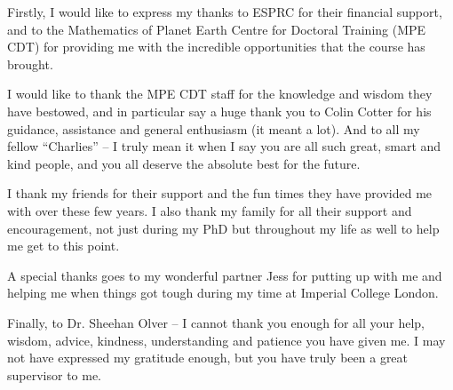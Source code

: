
\cleardoublepage


\begin{acknowledgements}

Firstly, I would like to express my thanks to ESPRC for their financial support, and to the Mathematics of Planet Earth Centre for Doctoral Training (MPE CDT) for providing me with the incredible opportunities that the course has brought. 

I would like to thank the MPE CDT staff for the knowledge and wisdom they have bestowed, and in particular say a huge thank you to Colin Cotter for his guidance, assistance and general enthusiasm (it meant a lot). And to all my fellow \enquote{Charlies} -- I truly mean it when I say you are all such great, smart and kind people, and you all deserve the absolute best for the future.

I thank my friends for their support and the fun times they have provided me with over these few years. I also thank my family for all their support and encouragement, not just during my PhD but throughout my life as well to help me get to this point.

A special thanks goes to my wonderful partner Jess for putting up with me and helping me when things got tough during my time at Imperial College London.

Finally, to Dr. Sheehan Olver -- I cannot thank you enough for all your help, wisdom, advice, kindness, understanding and patience you have given me. I may not have expressed my gratitude enough, but you have truly been a great supervisor to me.


%

\end{acknowledgements}
